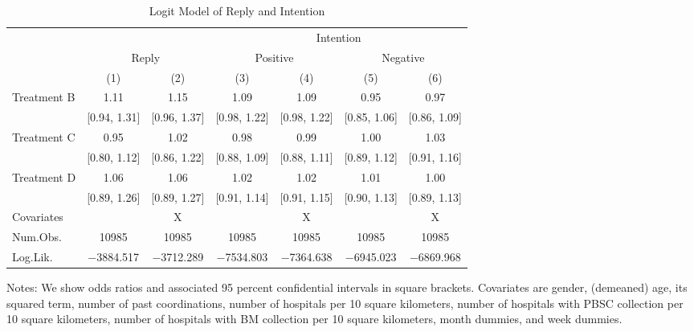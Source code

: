\documentclass[12pt, a4paper]{article}
\begin{document}
\begin{table}[H]

\caption{\label{tab:logit-stock}Logit Model of Reply and Intention}
\centering
\fontsize{9}{11}\selectfont
\begin{threeparttable}
\begin{tabular}[t]{lcccccc}
\toprule
\multicolumn{3}{c}{ } & \multicolumn{4}{c}{Intention} \\
\cmidrule(l{3pt}r{3pt}){4-7}
\multicolumn{1}{c}{ } & \multicolumn{2}{c}{Reply} & \multicolumn{2}{c}{Positive} & \multicolumn{2}{c}{Negative} \\
\cmidrule(l{3pt}r{3pt}){2-3} \cmidrule(l{3pt}r{3pt}){4-5} \cmidrule(l{3pt}r{3pt}){6-7}
  & (1) & (2) & (3) & (4) & (5) & (6)\\
\midrule
Treatment B & \num{1.11} & \num{1.15} & \num{1.09} & \num{1.09} & \num{0.95} & \num{0.97}\\
 & {}[\num{0.94}, \num{1.31}] & {}[\num{0.96}, \num{1.37}] & {}[\num{0.98}, \num{1.22}] & {}[\num{0.98}, \num{1.22}] & {}[\num{0.85}, \num{1.06}] & {}[\num{0.86}, \num{1.09}]\\
Treatment C & \num{0.95} & \num{1.02} & \num{0.98} & \num{0.99} & \num{1.00} & \num{1.03}\\
 & {}[\num{0.80}, \num{1.12}] & {}[\num{0.86}, \num{1.22}] & {}[\num{0.88}, \num{1.09}] & {}[\num{0.88}, \num{1.11}] & {}[\num{0.89}, \num{1.12}] & {}[\num{0.91}, \num{1.16}]\\
Treatment D & \num{1.06} & \num{1.06} & \num{1.02} & \num{1.02} & \num{1.01} & \num{1.00}\\
 & {}[\num{0.89}, \num{1.26}] & {}[\num{0.89}, \num{1.27}] & {}[\num{0.91}, \num{1.14}] & {}[\num{0.91}, \num{1.15}] & {}[\num{0.90}, \num{1.13}] & {}[\num{0.89}, \num{1.13}]\\
\midrule
Covariates &  & X &  & X &  & X\\
Num.Obs. & \num{10985} & \num{10985} & \num{10985} & \num{10985} & \num{10985} & \num{10985}\\
Log.Lik. & \num{-3884.517} & \num{-3712.289} & \num{-7534.803} & \num{-7364.638} & \num{-6945.023} & \num{-6869.968}\\
\bottomrule
\end{tabular}
\begin{tablenotes}
\item Notes: We show odds ratios and associated 95 percent confidential intervals in square brackets. Covariates are gender, (demeaned) age, its squared term, number of past coordinations, number of hospitals per 10 square kilometers, number of hospitals with PBSC collection per 10 square kilometers, number of hospitals with BM collection per 10 square kilometers, month dummies, and week dummies.
\end{tablenotes}
\end{threeparttable}
\end{table}
\end{document}
